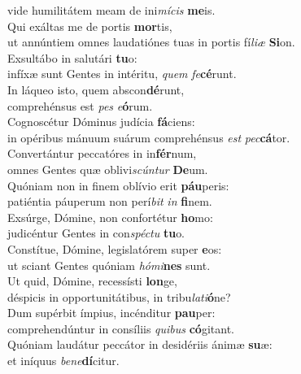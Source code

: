 \oddverse vide humilitátem meam de ini\textit{mí}\textit{cis} \textbf{me}is.\\
\evenverse Qui exáltas me de portis \textbf{mor}tis,~\*\\
\evenverse ut annúntiem omnes laudatiónes tuas in portis fí\textit{li}\textit{æ} \textbf{Si}on.\\
\oddverse Exsultábo in salutári \textbf{tu}o:~\*\\
\oddverse infíxæ sunt Gentes in intéritu, \textit{quem} \textit{fe}\textbf{cé}runt.\\
\evenverse In láqueo isto, quem abscon\textbf{dé}runt,~\*\\
\evenverse comprehénsus est \textit{pes} \textit{e}\textbf{ó}rum.\\
\oddverse Cognoscétur Dóminus judícia \textbf{fá}ciens:~\*\\
\oddverse in opéribus mánuum suárum comprehénsus \textit{est} \textit{pec}\textbf{cá}tor.\\
\evenverse Convertántur peccatóres in in\textbf{fér}num,~\*\\
\evenverse omnes Gentes quæ oblivi\textit{scún}\textit{tur} \textbf{De}um.\\
\oddverse Quóniam non in finem oblívio erit \textbf{páu}peris:~\*\\
\oddverse patiéntia páuperum non perí\textit{bit} \textit{in} \textbf{fi}nem.\\
\evenverse Exsúrge, Dómine, non confortétur \textbf{ho}mo:~\*\\
\evenverse judicéntur Gentes in con\textit{spé}\textit{ctu} \textbf{tu}o.\\
\oddverse Constítue, Dómine, legislatórem super \textbf{e}os:~\*\\
\oddverse ut sciant Gentes quóniam \textit{hó}\textit{mi}\textbf{nes} sunt.\\
\evenverse Ut quid, Dómine, recessísti \textbf{lon}ge,~\*\\
\evenverse déspicis in opportunitátibus, in tribu\textit{la}\textit{ti}\textbf{ó}ne?\\
\oddverse Dum supérbit ímpius, incénditur \textbf{pau}per:~\*\\
\oddverse comprehendúntur in consíliis \textit{qui}\textit{bus} \textbf{có}gitant.\\
\evenverse Quóniam laudátur peccátor in desidériis ánimæ \textbf{su}æ:~\*\\
\evenverse et iníquus \textit{be}\textit{ne}\textbf{dí}citur.\\
